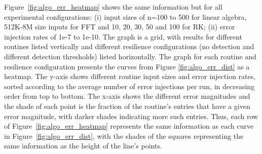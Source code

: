 \documentclass{sig-alternate}
\newcommand{\sui}[1]{%
  \textcolor{green}{SC - #1}
}
\newcommand{\greg}[1]{%
  \textcolor{blue}{GB: #1}
}
\begin{document}
Figure~\ref{fig:algo_err_heatmap} shows the same information but for all experimental configurations: (i) input sizes of n=100 to 500 for linear algebra, 512K-8M size inputs for FFT and 10, 20, 30, 50 and 100 for RK; (ii) error injection rates of 1e-7 to 1e-10.
The graph is a grid, with results for different routines listed vertically and different resilience configurations (no detection and different detection thresholds) listed horizontally.
The graph for each routine and resilience configuration presents the curves from Figure \ref{fig:algo_err_dist} as a heatmap.
The y-axis shows different routine input sizes and error injection rates, sorted according to the average number of error injections per run, in decreasing order from top to bottom.
The x-axis shows the different error magnitudes and the shade of each point is the fraction of the routine's entries that have a given error magnitude, with darker shades indicating more such entries.
Thus, each row of Figure~\ref{fig:algo_err_heatmap} represents the same information as each curve in Figure~\ref{fig:algo_err_dist}, with the shades of the squares representing the same information as the height of the line's points.

\end{document}
